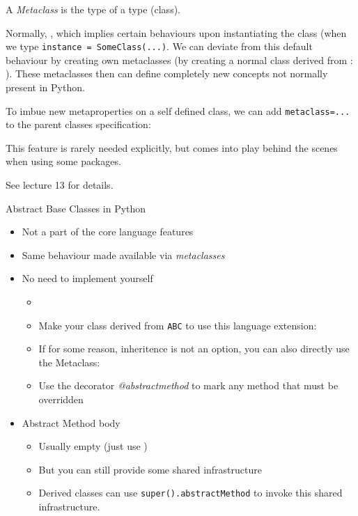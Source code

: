 \begin{frame}
%
\begin{recapbox}[Metaclasses]
\footnotesize
A \emph{Metaclass} is the type of a type (\ie class).

\vspace{5pt}
Normally, , which implies certain behaviours upon instantiating the class (\ie when we type \texttt{instance = SomeClass(...)}.
We can deviate from this default behaviour by creating own metaclasses (by creating a normal class derived from : ).
These metaclasses then can define completely new concepts not normally present in Python.

\vspace{5pt}
To imbue new metaproperties on a self defined class, we can add \texttt{metaclass=...} to the parent classes specification:\\

This feature is rarely needed explicitly, but comes into play behind the scenes when using some packages.

\vspace{5pt}
See lecture 13 for details.
\end{recapbox}
%
\end{frame}


\begin{frame}{Abstract Base Classes in Python}
%
\begin{itemize}
\item Not a part of the core language features
	\pause
\item Same behaviour made available via \emph{metaclasses}
	\pause
\item No need to implement yourself
	\begin{itemize}
	\item {}
	\item Make your class derived from \texttt{ABC} to use this language extension: 
	\item If for some reason, inheritence is not an option, you can also directly use the Metaclass: 
	\item Use the decorator \emph{@abstractmethod} to mark any method that must be overridden
	\end{itemize}
	\pause
\item Abstract Method body
	\begin{itemize}
	\item Usually empty (just use )
	\item But you can still provide some shared infrastructure
	\item Derived classes can use \texttt{super().abstractMethod} to invoke this shared infrastructure.
	\end{itemize}
\end{itemize}
%
\end{frame}


